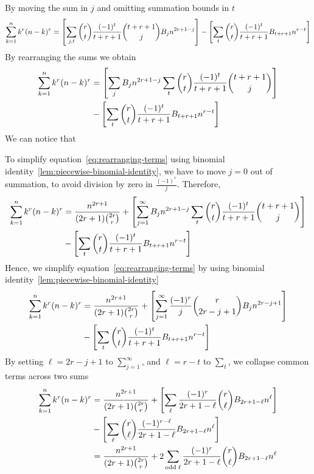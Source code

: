 By moving the sum in $j$ and omitting summation bounds in $t$
\begin{align*}
    \sum_{k=1}^{n} k^{r} (n-k)^{r}
    = \left[ \sum_{j, t} \binom{r}{t} \frac{(-1)^t}{t+r+1} \binom{t+r+1}{j} {B}\sb{j} n^{2r+1-j}  \right]
    - \left[ \sum_{t} \binom{r}{t} \frac{(-1)^t}{t+r+1} {B}\sb{t+r+1} n^{r-t} \right]
\end{align*}
By rearranging the sums we obtain
\begin{align}
    \label{eq:rearranging-terms}
    \sum_{k=1}^{n} k^{r} (n-k)^{r}
    &= \left[ \sum_{j} {B}\sb{j} n^{2r+1-j} \sum_{t} \binom{r}{t} \frac{(-1)^t}{t+r+1} \binom{t+r+1}{j}  \right] \\
    &- \left[ \sum_{t} \binom{r}{t} \frac{(-1)^t}{t+r+1} {B}\sb{t+r+1} n^{r-t} \right] \nonumber
\end{align}
We can notice that

To simplify equation~\eqref{eq:rearranging-terms} using binomial identity~\eqref{lem:piecewise-binomial-identity}, we have to move $j=0$ out of
summation, to avoid division by zero in $\frac{(-1)^r}{j}$.
Therefore,
\begin{equation*}
    \begin{split}
        \sum_{k=1}^{n} k^{r} (n-k)^{r}
        &= \frac{n^{2r+1}}{(2r+1) \binom{2r}r}
        + \left[ \sum_{j = 1}^{\infty} {B}\sb{j} n^{2r+1-j} \sum_{t} \binom{r}{t} \frac{(-1)^t}{t+r+1} \binom{t+r+1}{j} \right] \\
        &- \left[ \sum_{t} \binom{r}{t} \frac{(-1)^t}{t+r+1} {B}\sb{t+r+1} n^{r-t} \right]
    \end{split}
\end{equation*}
Hence, we simplify equation~\eqref{eq:rearranging-terms} by using binomial identity~\eqref{lem:piecewise-binomial-identity}
\begin{equation*}
    \begin{split}
        \sum_{k=1}^{n} k^{r} (n-k)^{r}
        &= \frac{n^{2r+1}}{(2r+1) \binom{2r}r}
        + \left[ \sum_{j=1}^{\infty} \frac{(-1)^r}{j} \binom{r}{2r-j+1} {B}\sb{j} n^{2r-j+1} \right] \\
        &- \left[ \sum_{t} \binom{r}{t} \frac{(-1)^t}{t+r+1} {B}\sb{t+r+1} n^{r-t} \right]
    \end{split}
\end{equation*}
By setting $\ell=2r-j+1$ to $\sum_{j=1}^{\infty}$, and $\ell=r-t$ to $\sum_{t}$,
we collapse common terms across two sums
\begin{align*}
    \sum_{k=1}^{n} k^{r} (n-k)^{r}
    &= \frac{n^{2r+1}}{(2r+1) \binom{2r}r}
    + \left[ \sum_{\ell} \frac{(-1)^r}{2r+1-\ell} \binom{r}{\ell} {B}\sb{2r+1-\ell} n^{\ell} \right] \\
    &- \left[ \sum_{\ell} \binom{r}{\ell} \frac{(-1)^{r-\ell}}{2r+1-\ell} {B}\sb{2r+1-\ell} n^{\ell} \right]\\
    &= \frac{n^{2r+1}}{(2r+1) \binom{2r}r} + 2 \sum_{\mathrm{odd \; \ell}} \frac{(-1)^r}{2r+1-\ell} \binom{r}{\ell} {B}\sb{2r+1-\ell} n^{\ell}
\end{align*}
